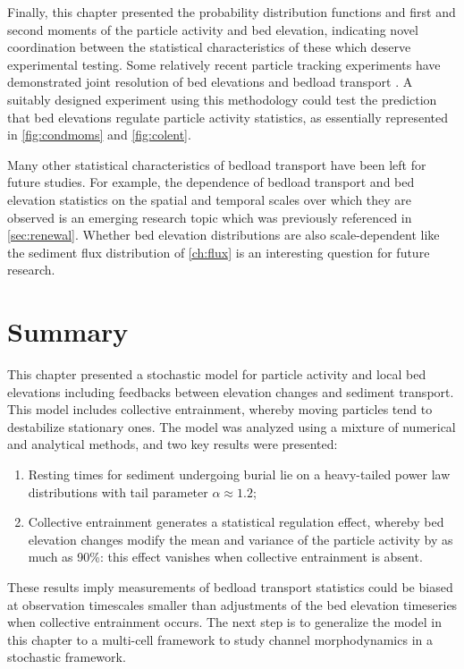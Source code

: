 Finally, this chapter presented the probability distribution functions and first and second moments of the particle activity and bed elevation, indicating novel coordination between the statistical characteristics of these \DIFdelbegin {}\DIFdelend \DIFaddbegin {}\DIFaddend which deserve experimental testing.
Some relatively recent particle tracking experiments have demonstrated joint resolution of bed elevations and bedload transport \citep{Martin2014,Heyman2016}.
A suitably designed experiment using this methodology could test the prediction that bed elevations regulate particle activity statistics, as essentially represented in \DIFdelbegin {}\DIFdelend \DIFaddbegin {}\DIFaddend \ref{fig:condmoms} and \ref{fig:colent}. 

Many other statistical characteristics of bedload transport have been left for future studies. 
For example, the dependence of bedload transport \citep{Saletti2015,Singh2009} and bed elevation statistics \citep{Aberle2006, Singh2009,Singh2012} on the spatial and temporal scales over which they are observed is an emerging research topic which was previously referenced in \DIFdelbegin {}\DIFdelend \DIFaddbegin {}\DIFaddend \ref{sec:renewal}.
Whether bed elevation distributions are also scale-dependent like the sediment flux distribution of \DIFdelbegin {}\DIFdelend \DIFaddbegin {}\DIFaddend \ref{ch:flux} is an interesting question for future research.

\section{Summary}
\label{sec:eleconclusion}

This chapter presented a stochastic model for particle activity and local bed elevations including feedbacks between elevation changes and sediment transport.
This model includes collective entrainment, whereby moving particles tend to destabilize stationary ones.
The model was analyzed using a mixture of numerical and analytical methods, and two key results were presented:
\begin{enumerate}
	\item Resting times for sediment undergoing burial lie on a heavy-tailed power law distributions with tail parameter $\alpha \approx 1.2$;
	\item Collective entrainment generates a statistical regulation effect, whereby bed elevation changes modify the mean and variance of the particle activity by as much as 90\%: this effect vanishes when collective entrainment is absent.
\end{enumerate}
These results imply measurements of bedload transport statistics could be biased at observation timescales smaller than adjustments of the bed elevation timeseries when collective entrainment occurs.
The next step is to generalize the model in this chapter to a multi-cell framework to study channel morphodynamics in a stochastic framework.
